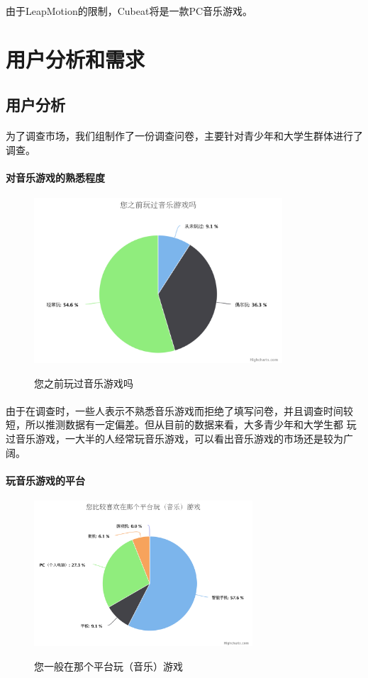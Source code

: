 \documentclass{article} \usepackage{CJK}
\begin{document}
\paragraph{}
由于LeapMotion的限制，Cubeat将是一款PC音乐游戏。
\newpage
\section{用户分析和需求}
\subsection{用户分析}
\paragraph{}
为了调查市场，我们组制作了一份调查问卷，主要针对青少年和大学生群体进行了调查。
\paragraph{对音乐游戏的熟悉程度}
\begin{figure}[h]
  \centering
  \includegraphics[width=25em]{chart1.png}\\
  \caption{您之前玩过音乐游戏吗}\label{2-1}
\end{figure}
\paragraph{}
由于在调查时，一些人表示不熟悉音乐游戏而拒绝了填写问卷，并且调查时间较短，所以推测数据有一定偏差。但从目前的数据来看，大多青少年和大学生都
玩过音乐游戏，一大半的人经常玩音乐游戏，可以看出音乐游戏的市场还是较为广阔。
\paragraph{玩音乐游戏的平台}
\begin{figure}[H]
  \centering
  \includegraphics[width=22em]{chart2.png}\\
  \caption{您一般在那个平台玩（音乐）游戏}\label{2-2}
\end{figure}
\end{document}
